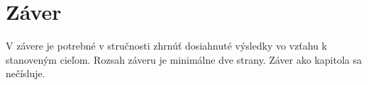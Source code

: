 \chapter*{Záver}

V závere je potrebné v stručnosti zhrnúť dosiahnuté výsledky vo vzťahu k stanoveným 
cieľom. Rozsah záveru je minimálne dve strany. Záver ako kapitola sa nečísluje. 